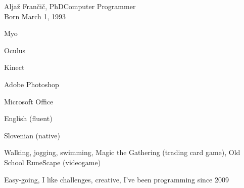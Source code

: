 \documentclass{article}
\begin{document}
\begin{cv}[avatar]{Aljaž Frančič, PhD}{Computer Programmer\\\small{Born March 1, 1993}}
\begin{cvitem}
    Myo
\end{cvitem}

\begin{cvitem}
    Oculus
\end{cvitem}

\begin{cvitem}
    Kinect
\end{cvitem}

\begin{cvitem}
    Adobe Photoshop
\end{cvitem}

\begin{cvitem}
    Microsoft Office
\end{cvitem}


\begin{cvitem}
    English (fluent)
\end{cvitem}

\begin{cvitem}
    Slovenian (native)
\end{cvitem}

Walking, jogging, swimming, Magic the Gathering (trading card game), Old School RuneScape (videogame)

Easy-going, I like challenges, creative, I’ve been programming since 2009

\end{cv}
\end{document}

